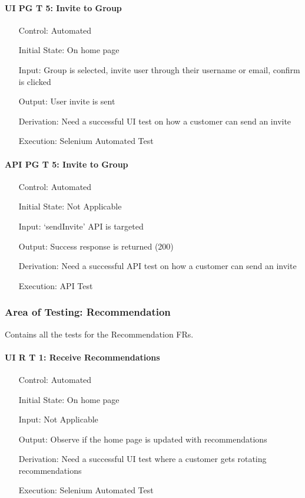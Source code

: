 \documentclass[12pt, titlepage]{article}
\begin{document}
\paragraph*{UI PG T 5: Invite to Group}
\begin{itemize}
	\item[Control:] Automated
	\item[Initial State:] On home page
	\item[Input:] Group is selected, invite user through their username or email, confirm is clicked
	\item[Output:] User invite is sent
	\item[Derivation:] Need a successful UI test on how a customer can send an invite
	\item[Execution:] Selenium Automated Test
\end{itemize}

\paragraph*{API PG T 5: Invite to Group}
\begin{itemize}
	\item[Control:] Automated
	\item[Initial State:] Not Applicable
	\item[Input:] `sendInvite' API is targeted
	\item[Output:] Success response is returned (200)
	\item[Derivation:] Need a successful API test on how a customer can send an invite
	\item[Execution:] API Test
\end{itemize}

\subsubsection{Area of Testing: Recommendation}
Contains all the tests for the Recommendation FRs.

\paragraph*{UI R T 1: Receive Recommendations}
\begin{itemize}
	\item[Control:] Automated
	\item[Initial State:] On home page
	\item[Input:] Not Applicable
	\item[Output:] Observe if the home page is updated with recommendations
	\item[Derivation:] Need a successful UI test where a customer gets rotating recommendations
	\item[Execution:] Selenium Automated Test
\end{itemize}
\end{document}
